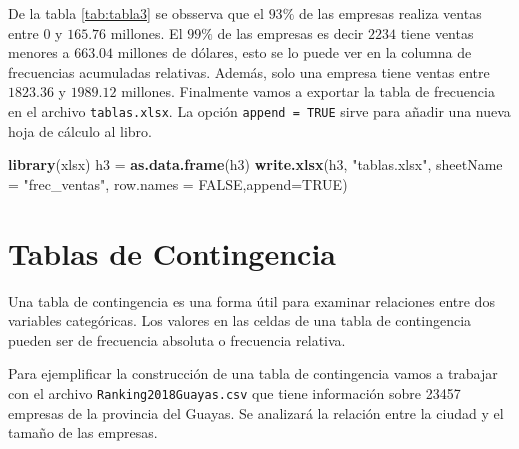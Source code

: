 \documentclass[letterpaper,]{book}
\newenvironment{Shaded}{\begin{snugshade}}{\end{snugshade}}
\newcommand{\DataTypeTok}[1]{\textcolor[rgb]{0.13,0.29,0.53}{#1}}
\newcommand{\DecValTok}[1]{\textcolor[rgb]{0.00,0.00,0.81}{#1}}
\newcommand{\KeywordTok}[1]{\textcolor[rgb]{0.13,0.29,0.53}{\textbf{#1}}}
\newcommand{\NormalTok}[1]{#1}
\newcommand{\OperatorTok}[1]{\textcolor[rgb]{0.81,0.36,0.00}{\textbf{#1}}}
\newcommand{\OtherTok}[1]{\textcolor[rgb]{0.56,0.35,0.01}{#1}}
\newcommand{\StringTok}[1]{\textcolor[rgb]{0.31,0.60,0.02}{#1}}
\begin{document}
De la tabla \ref{tab:tabla3} se obsserva que el \(93\%\) de las empresas realiza ventas entre 0 y \(165.76\) millones. El \(99\%\) de las empresas es decir \(2234\) tiene ventas menores a \(663.04\) millones de dólares, esto se lo puede ver en la columna de frecuencias acumuladas relativas. Además, solo una empresa tiene ventas entre \(1823.36\) y \(1989.12\) millones. Finalmente vamos a exportar la tabla de frecuencia en el archivo \texttt{tablas.xlsx}. La opción \texttt{append\ =\ TRUE} sirve para añadir una nueva hoja de cálculo al libro.

\begin{Shaded}
\begin{Highlighting}[]
\KeywordTok{library}\NormalTok{(xlsx)}
\NormalTok{h3 =}\StringTok{ }\KeywordTok{as.data.frame}\NormalTok{(h3)}
\KeywordTok{write.xlsx}\NormalTok{(h3, }\StringTok{"tablas.xlsx"}\NormalTok{, }\DataTypeTok{sheetName =} \StringTok{"frec_ventas"}\NormalTok{, }\DataTypeTok{row.names =} \OtherTok{FALSE}\NormalTok{,}\DataTypeTok{append=}\OtherTok{TRUE}\NormalTok{)}
\end{Highlighting}
\end{Shaded}

\hypertarget{tablas-de-contingencia}{%
\section{Tablas de Contingencia}\label{tablas-de-contingencia}}

Una tabla de contingencia es una forma útil para examinar relaciones entre dos variables categóricas. Los valores en las celdas de una tabla de contingencia pueden ser de frecuencia absoluta o frecuencia relativa.

Para ejemplificar la construcción de una tabla de contingencia vamos a trabajar con el archivo \texttt{Ranking2018Guayas.csv} que tiene información sobre 23457 empresas de la provincia del Guayas. Se analizará la relación entre la ciudad y el tamaño de las empresas.

\begin{Shaded}
\end{Shaded}
\end{document}
